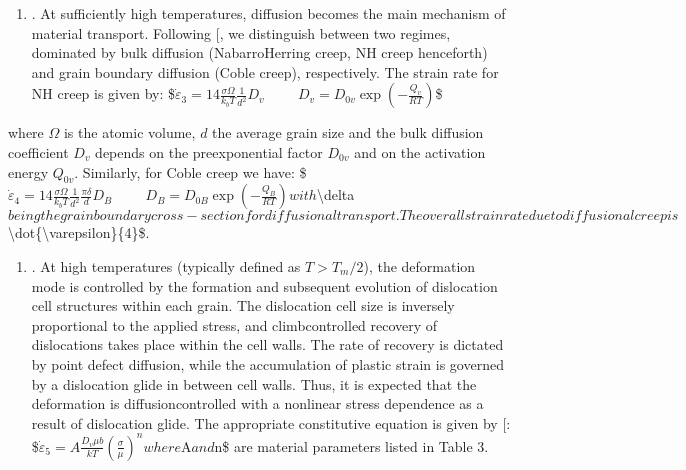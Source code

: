\documentclass[letterpaper,10pt,english]{jupyterBook}
\begin{document}
	
	\begin{enumerate}
		\setcounter{enumi}{2}
		\item {} 
		\sphinxAtStartPar
		. At sufficiently high temperatures, diffusion becomes the main mechanism of material transport. Following {[}\sphinxhref{https://drive.google.com/file/d/1APELUCmPwMVPnGgeBDs-uroUFJODEYKi/view?usp=drive\_link}{Ashby1972}{]}, we distinguish between two regimes, dominated by bulk diffusion (Nabarro\sphinxhyphen{}Herring creep, NH creep henceforth) and grain boundary diffusion (Coble creep), respectively. The strain rate for NH creep is given by:
		\$\(\dot{\varepsilon}_{3}=14\frac{\sigma \Omega}{k_b T }\frac{1}{d^2}D_v \hspace{1cm} D_v=D_{0v}\exp\left(-\frac{Q_v}{RT}\right)\)\$
		
	\end{enumerate}
	
	
	
	\sphinxAtStartPar
	where \(\Omega\) is the atomic volume, \(d\) the average grain size and the bulk diffusion coefficient \(D_v\) depends on the pre\sphinxhyphen{}exponential factor \(D_{0v}\) and  on the activation energy \(Q_{0v}\). Similarly, for Coble creep we have:
	\$\(\dot{\varepsilon}_{4}=14\frac{\sigma \Omega}{k_b T }\frac{1}{d^2}\frac{\pi\delta}{d}D_{B}\hspace{1cm} D_B=D_{0B}\exp\left(-\frac{Q_B}{RT}\right)\)\(
	with \)\textbackslash{}delta\( being the grain boundary cross-section for diffusional transport. The overall strain rate due to diffusional creep is \)\textbackslash{}dot\{\textbackslash{}varepsilon\}\{4\}\$.
	\begin{enumerate}
		\setcounter{enumi}{3}
		\item {} 
		\sphinxAtStartPar
		. At high temperatures (typically defined as \(T > T_m/2\)), the deformation mode is controlled by the formation and subsequent evolution of dislocation cell structures within each grain. The dislocation cell size is inversely proportional to the applied stress, and climb\sphinxhyphen{}controlled recovery of dislocations takes place within the cell walls. The rate of recovery is dictated by point defect diffusion, while the accumulation of plastic strain is governed by a dislocation glide in between cell walls.  Thus, it is expected that the deformation is diffusion\sphinxhyphen{}controlled with a non\sphinxhyphen{}linear stress dependence as a result of dislocation glide.  The appropriate constitutive equation is given by {[}\sphinxhref{https://drive.google.com/file/d/1HmPhT33wSLbYiI7b\_WkYlS9huutVdaoQ/view?usp=drive\_link}{Mukherjee1968}{]}:
		\$\(\dot{\varepsilon}_{5}=A\frac{D_v\mu b}{k T }\left(\frac{\sigma}{\mu}\right)^n\)\(
		where \)A\( and \)n\$ are material parameters listed in Table 3.
		
	\end{enumerate}
	
\end{document}
